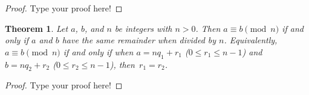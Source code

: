 \documentclass[12pt,leqno]{article}
\numberwithin{equation}{section}
\newtheorem{thm}{Theorem}[section]
\theoremstyle{definition}
\begin{document}
\begin{proof}[Proof]
Type your proof here!
\end{proof}

\begin{thm}
Let $a$, $b$, and $n$ be integers with $n > 0$.  Then $a \equiv b
\pmod{n}$ if and only if $a$ and $b$ have the same remainder when
divided by $n$.  Equivalently, $a \equiv b \pmod{n}$ if and only if
when $a = nq_1 + r_1$ ($0 \leq r_1 \leq n-1$) and $b = nq_2 + r_2$
($0 \leq r_2 \leq n-1$), then~$r_1 = r_2$.
\end{thm}

\begin{proof}[Proof]
Type your proof here!
\end{proof}
\end{document}
